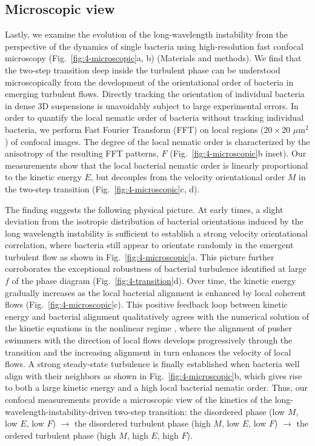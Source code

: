 \subsection{Microscopic view}
Lastly, we examine the evolution of the long-wavelength instability from the perspective of the dynamics of single bacteria using high-resolution fast confocal microscopy (Fig.~\ref{fig:4-microscopic}a, b) (Materials and methods). We find that the two-step transition deep inside the turbulent phase can be understood microscopically from the development of the orientational order of bacteria in emerging turbulent flows. Directly tracking the orientation of individual bacteria in dense 3D suspensions is unavoidably subject to large experimental errors. In order to quantify the local nematic order of bacteria without tracking individual bacteria, we perform Fast Fourier Transform (FFT) on local regions ($20 \times 20$ $\mu$m$^2$) of confocal images. The degree of the local nematic order is characterized by the anisotropy of the resulting FFT patterns, $F$ (Fig.~\ref{fig:4-microscopic}b inset). Our measurements show that the local bacterial nematic order is linearly proportional to the kinetic energy $E$, but decouples from the velocity orientational order $M$ in the two-step transition (Fig.~\ref{fig:4-microscopic}c, d).

The finding suggests the following physical picture. At early times, a slight deviation from the isotropic distribution of bacterial orientations induced by the long wavelength instability is sufficient to establish a strong velocity orientational correlation, where bacteria still appear to orientate randomly in the emergent turbulent flow as shown in Fig.~\ref{fig:4-microscopic}a. This picture further corroborates the exceptional robustness of bacterial turbulence identified at large $f$ of the phase diagram (Fig.~\ref{fig:4-transition}d). Over time, the kinetic energy gradually increases as the local bacterial alignment is enhanced by local coherent flows (Fig.~\ref{fig:4-microscopic}c). This positive feedback loop between kinetic energy and bacterial alignment qualitatively agrees with the numerical solution of the kinetic equations in the nonlinear regime \cite{Saintillan2008b}, where the alignment of pusher swimmers with the direction of local flows develops progressively through the transition and the increasing alignment in turn enhances the velocity of local flows.
A strong steady-state turbulence is finally established when bacteria well align with their neighbors as shown in Fig.~\ref{fig:4-microscopic}b, which gives rise to both a large kinetic energy and a high local bacterial nematic order. Thus, our confocal measurements provide a microscopic view of the kinetics of the long-wavelength-instability-driven two-step transition: the disordered phase (low $M$, low $E$, low $F$) $\to$ the disordered turbulent phase (high $M$, low $E$, low $F$) $\to$ the ordered turbulent phase (high $M$, high $E$, high $F$).

